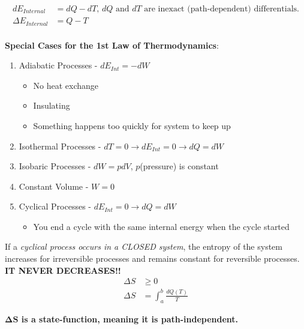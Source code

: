 		\begin{definition} \label{def:1st Law of Thermo}
			\begin{equation} \label{eq:1st Law of Thermo}
				\begin{aligned}
					dE_{Internal} &= dQ - dT \text{, } dQ \text{ and } dT \text{ are inexact	(path-dependent) differentials.} \\
					\Delta E_{Internal} &= Q-T \\
				\end{aligned}
			\end{equation}
			\begin{note} \label{note:1st Law of Thermo Special Cases}
				\textbf{Special Cases for the 1st Law of Thermodynamics}:
				\begin{enumerate}
					\item Adiabatic Processes - $dE_{Int} = -dW$
					\begin{itemize}[noitemsep, nolistsep]
						\item No heat exchange
						\item Insulating
						\item Something happens too quickly for system to keep up
					\end{itemize}
					\item Isothermal Processes - $dT = 0 \rightarrow dE_{Int} = 0 \rightarrow dQ = dW$
					\item Isobaric Processes - $dW = pdV$, $p$(pressure) is constant
					\item Constant Volume - $W = 0$
					\item Cyclical Processes - $dE_{Int} = 0 \rightarrow dQ = dW$
					\begin{itemize}[noitemsep, nolistsep]
						\item You end a cycle with the same internal energy when the cycle started
					\end{itemize}
				\end{enumerate}
			\end{note}
		\end{definition}
		\begin{definition} \label{def:2nd Law of Thermo}
			If a \emph{cyclical process occurs in a CLOSED system}, the entropy of the system increases for irreversible processes and remains constant for reversible processes. \textbf{IT NEVER DECREASES!!}
			\begin{align} \label{eq:2nd Law of Thermo}
				\Delta S &\geq 0 \\
				\Delta S &= \int_{a}^{b} \frac{dQ \left( T \right)}{T} 
			\end{align}
			\begin{note}
				\textbf{$\mathbf{\Delta S}$ is a state-function, meaning it is path-independent.}
			\end{note}
		\end{definition}
	
